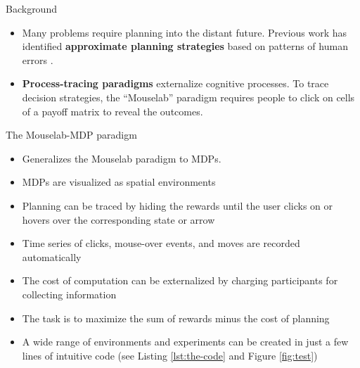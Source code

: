 \documentclass[final]{beamer}
\newlength{\onecolwid}
\begin{document}
\begin{frame}[t, fragile]
\begin{columns}[t]
\begin{column}{\onecolwid}
  \begin{block}{Background}\label{Background}
    \begin{itemize}
      \item %
            Many problems require planning into the distant future.
            Previous work has identified %
            \textbf{approximate planning strategies} based on patterns of human errors \cite{Huys2015}.
      \item \textbf{Process-tracing paradigms} externalize cognitive processes.
            To trace decision strategies, the ``Mouselab'' paradigm \cite{Payne1988} requires people to click on cells of a payoff matrix to reveal the outcomes.
    \end{itemize}

    

  \end{block}

    \begin{block}{The Mouselab-MDP paradigm}\label{paradigm}
    \begin{itemize}
        \item Generalizes the Mouselab paradigm to MDPs.
        \item MDPs are visualized as spatial environments
        \item Planning can be traced  by hiding the rewards until the user clicks on or hovers over the corresponding state or arrow
        \item Time series of clicks, mouse-over events, and moves are recorded automatically
        \item The cost of computation can be externalized by charging participants for collecting information
        \item The task is to maximize the sum of rewards minus the cost of planning
        \item A wide range of environments and experiments can be created in just a few  lines of intuitive code (see Listing \ref{lst:the-code} and Figure \ref{fig:test})

    \end{itemize}
    \end{block}


\end{column} %


\end{columns}
\end{frame}
\end{document}

